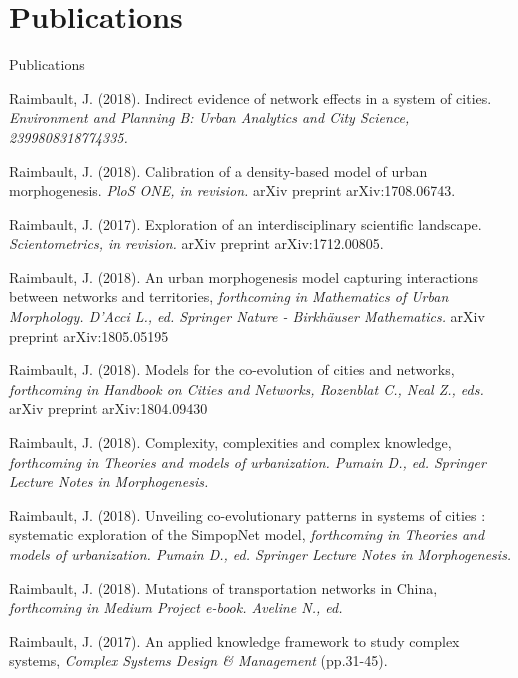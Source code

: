 \section*{Publications}{Publications}


\noindent Raimbault, J. (2018). Indirect evidence of network effects in a system of cities. \textit{Environment and Planning B: Urban Analytics and City Science, 2399808318774335.}

\bigskip


\noindent Raimbault, J. (2018). Calibration of a density-based model of urban morphogenesis. \textit{PloS ONE, in revision.} arXiv preprint arXiv:1708.06743.

\bigskip

\noindent Raimbault, J. (2017). Exploration of an interdisciplinary scientific landscape. \textit{Scientometrics, in revision.} arXiv preprint arXiv:1712.00805.


\bigskip

\noindent Raimbault, J. (2018). An urban morphogenesis model capturing interactions between networks and territories, \textit{forthcoming in Mathematics of Urban Morphology. D'Acci L., ed. Springer Nature - Birkhäuser Mathematics.} arXiv preprint arXiv:1805.05195

\bigskip

\noindent Raimbault, J. (2018). Models for the co-evolution of cities and networks, \textit{forthcoming in Handbook on Cities and Networks, Rozenblat C., Neal Z., eds.} arXiv preprint arXiv:1804.09430

\bigskip

\noindent Raimbault, J. (2018). Complexity, complexities and complex knowledge, \textit{forthcoming in Theories and models of urbanization. Pumain D., ed. Springer Lecture Notes in Morphogenesis.}

\bigskip

\noindent Raimbault, J. (2018). Unveiling co-evolutionary patterns in systems of cities : systematic exploration of the SimpopNet model, \textit{forthcoming in Theories and models of urbanization. Pumain D., ed. Springer Lecture Notes in Morphogenesis.}

\bigskip

\noindent Raimbault, J. (2018). Mutations of transportation networks in China, \textit{forthcoming in Medium Project e-book. Aveline N., ed.}

\bigskip

\noindent Raimbault, J. (2017). An applied knowledge framework to study complex systems, \textit{Complex Systems Design \& Management} (pp.31-45).

